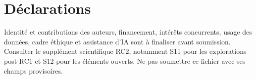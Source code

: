 \documentclass[french]{IOS-Book-Article}
\begin{document}
\begin{frontmatter}
\title{\PaperTitle}
\author{\PaperAuthors}
\address{\PaperAffiliation}
\begin{abstract}

\end{abstract}
\begin{keyword}
\PaperKeywords
\end{keyword}
\end{frontmatter}

\section*{Déclarations}
Identité et contributions des auteurs, financement, intérêts concurrents, usage des données, cadre éthique et assistance d'IA sont à finaliser avant soumission. Consulter le supplément scientifique RC2, notamment S11 pour les explorations post-RC1 et S12 pour les éléments ouverts. Ne pas soumettre ce fichier avec ses champs provisoires.


\end{document}
